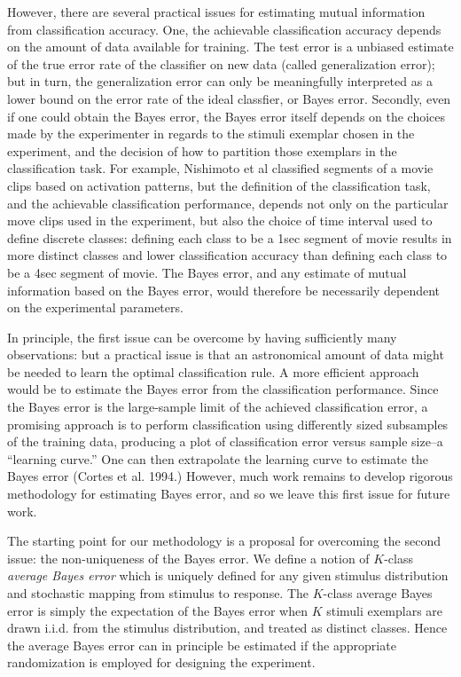 \documentclass[12pt]{article}
\begin{document}
However, there are several practical issues for estimating mutual information from classification accuracy. 
One, the achievable classification accuracy depends on the amount of data available for training.
The test error is a unbiased estimate of the true error rate of the classifier on new data (called generalization error);
but in turn, the generalization error can only be meaningfully interpreted as a lower bound on the error rate of the ideal classfier,
or Bayes error.  Secondly, even if one could obtain the Bayes error, the Bayes error itself depends on the choices made by the experimenter
in regards to the stimuli exemplar chosen in the experiment, and the decision of how to partition those exemplars in the classification task.
For example, Nishimoto et al classified segments of a movie clips based on activation patterns, but the definition of the classification task,
and the achievable classification performance, depends not only on the particular move clips used in the experiment, but also
the choice of time interval used to define discrete classes: defining each class to be a 1sec segment of movie results in more distinct classes
and lower classification accuracy than defining each class to be a 4sec segment of movie.
The Bayes error, and any estimate of mutual information based on the Bayes error, would therefore be necessarily dependent on the experimental parameters.

In principle, the first issue can be overcome by having sufficiently many observations: but a practical issue is that an astronomical amount
of data might be needed to learn the optimal classification rule.  A more efficient approach would be to estimate the Bayes error from
the classification performance.  Since the Bayes error is the large-sample limit of the achieved classification error, a promising approach is
to perform classification using differently sized subsamples of the training data, producing a plot of classification error versus sample size--a ``learning curve.''
One can then extrapolate the learning curve to estimate the Bayes error (Cortes et al. 1994.)
However, much work remains to develop rigorous methodology for estimating Bayes error, and so we leave this first issue for future work.

The starting point for our methodology is a proposal for overcoming the second issue: the non-uniqueness of the Bayes error.
We define a notion of $K$-class \emph{average Bayes error} which is uniquely defined for any given stimulus distribution and stochastic mapping from stimulus to response.  The $K$-class average Bayes error is simply the expectation of the Bayes error when $K$ stimuli exemplars are drawn i.i.d. from the stimulus distribution, and treated as distinct classes.  Hence the average Bayes error can in principle be estimated if the appropriate randomization is employed
for designing the experiment.
\end{document}
